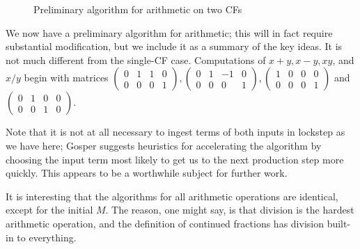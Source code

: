 \documentclass[11pt, oneside]{amsart}   	%
\newcommand{\bihomographic}[8]{\left(\begin{smallmatrix}#1&#2&#3&#4\\#5&#6&#7&#8\end{smallmatrix}\right)}
\newcommand{\abcd}{\left(
\begin{smallmatrix} 
a & b & c & d\\ 
e & f & g & h
\end{smallmatrix}
\right)}
\begin{document}
\begin{figure}\label{fig:twoCFarithPrelim}
\begin{algorithmic}
 
 
\STATE{$M \gets \abcd$} 
           \ENDWHILE
\ENDWHILE
\end{algorithmic}
\caption{Preliminary algorithm for arithmetic on two CFs}
\end{figure}

We now have a preliminary algorithm for arithmetic; this will in fact require substantial modification, but we include it as a summary
of the key ideas. It is not much different from the single-CF case. Computations of $x+y, x-y,xy$, and $x/y$ begin with matrices
$\bihomographic{0}{1}{1}{0}{0}{0}{0}{1}, \bihomographic{0}{1}{-1}{0}{0}{0}{0}{1},
\bihomographic{1}{0}{0}{0}{0}{0}{0}{1}$ and $\bihomographic{0}{1}{0}{0}{0}{0}{1}{0}$.

Note that it is not at all necessary to ingest terms of both inputs in lockstep as we have here;
Gosper suggests heuristics for accelerating the algorithm by choosing the input term most likely to get us to the next production step
more quickly. This appears to be a worthwhile subject for further work.

It is interesting that the algorithms for all arithmetic operations are identical, except for the initial $M$. The reason, one might say, is
that division is the hardest arithmetic operation, and the definition of continued fractions has division built-in to everything.
\end{document}
